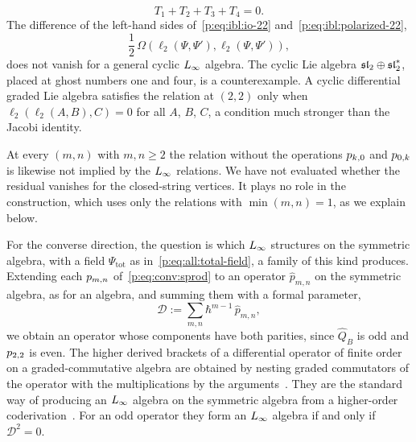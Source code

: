 \begin{equation}
  \label{p:eq:ibl:io-22}
  T_1 + T_2 + T_3 + T_4
    = 0.
\end{equation}
The difference of the left-hand sides of~\eqref{p:eq:ibl:io-22} and~\eqref{p:eq:ibl:polarized-22},
\begin{equation}
  \label{p:eq:ibl:residual-22}
  \frac{1}{2} \, \Omega(\ell_2(\Psi, \Psi'), \ell_2(\Psi, \Psi')),
\end{equation}
does not vanish for a general cyclic $L_\infty$ algebra.
The cyclic Lie algebra $\mathfrak{sl}_2 \oplus \mathfrak{sl}_2^*$, placed at ghost numbers one and four, is a counterexample.
A cyclic differential graded Lie algebra satisfies the relation at $(2, 2)$ only when $\ell_2(\ell_2(A, B), C) = 0$ for all $A$, $B$, $C$, a condition much stronger than the Jacobi identity.

At every $(m, n)$ with $m, n \ge 2$ the relation without the operations $p_{k,0}$ and $p_{0,k}$ is likewise not implied by the $L_\infty$ relations.
We have not evaluated whether the residual vanishes for the closed-string vertices.
It plays no role in the construction, which uses only the relations with $\min(m, n) = 1$, as we explain below.

For the converse direction, the question is which $L_\infty$ structures on the symmetric algebra, with a field $\Psi_{\mathrm{tot}}$ as in~\eqref{p:eq:all:total-field}, a family of this kind produces.
Extending each $p_{m,n}$ of~\eqref{p:eq:conv:sprod} to an operator $\hat{p}_{m, n}$ on the symmetric algebra, as for an \IBL{} algebra, and summing them with a formal parameter,
\begin{equation}
  \label{p:eq:ibl:D}
  \mathcal D
    := \sum_{m, n} \hbar^{m-1} \, \hat{p}_{m, n},
\end{equation}
we obtain an operator whose components have both parities, since $\hat Q_B$ is odd and $p_{2,2}$ is even.
The higher derived brackets of a differential operator of finite order on a graded-commutative algebra are obtained by nesting graded commutators of the operator with the multiplications by the arguments~\cite{Akman:1997:GeneralizationsBatalinVilkoviskyAlgebras, Bering:1996:AlgebraHigherAntibrackets}.
They are the standard way of producing an $L_\infty$ algebra on the symmetric algebra from a higher-order coderivation~\cite{Muenster:2013:QuantumOpenClosedHomotopy, Muenster:2014:HomotopyClassificationBosonic}.
For an odd operator they form an $L_\infty$ algebra if and only if $\mathcal D^2 = 0$.

